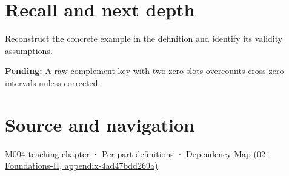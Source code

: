 \section{Recall and next depth}\label{appendix-deca299ae4b8-recall-and-next-depth}

Reconstruct the concrete example in the definition and identify its validity assumptions.

\textbf{Pending:} A raw complement key with two zero slots overcounts cross-zero intervals unless corrected.

\section{Source and navigation}\label{appendix-deca299ae4b8-source-and-navigation}

\href{Continuous\%20Notes/Computing\%20Foundations\%20-\%20From\%20Bits\%20to\%20C++\%20and\%20Systems\%20APIs\#A\%20stretching\%20ruler\%20for\%20real-valued\%20quantities}{M004 teaching chapter} · \hyperref[appendix-fd090d982a15-m004---parts-61-76]{Per-part definitions} · \href{../02-Foundations-II/main.pdf\#nameddest=appendix-4ad47bdd269a}{Dependency Map (02-Foundations-II, appendix-4ad47bdd269a)}
